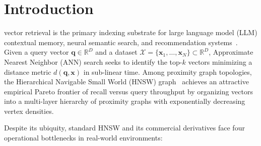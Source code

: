 \documentclass[10pt,journal,compsoc]{IEEEtran}
\begin{document}
\maketitle
\IEEEdisplaynontitleabstractindextext
\IEEEpeerreviewmaketitle

\section{Introduction}
 vector retrieval is the primary indexing substrate for large language model (LLM) contextual memory, neural semantic search, and recommendation systems~\cite{malkov2020efficient, johnson2021billion}. Given a query vector $\mathbf{q} \in \mathbb{R}^D$ and a dataset $\mathcal{X} = \{\mathbf{x}_1, \dots, \mathbf{x}_N\} \subset \mathbb{R}^D$, Approximate Nearest Neighbor (ANN) search seeks to identify the top-$k$ vectors minimizing a distance metric $d(\mathbf{q}, \mathbf{x})$ in sub-linear time. Among proximity graph topologies, the Hierarchical Navigable Small World (HNSW) graph~\cite{malkov2020efficient} achieves an attractive empirical Pareto frontier of recall versus query throughput by organizing vectors into a multi-layer hierarchy of proximity graphs with exponentially decreasing vertex densities.

Despite its ubiquity, standard HNSW and its commercial derivatives face four operational bottlenecks in real-world environments:
\end{document}
